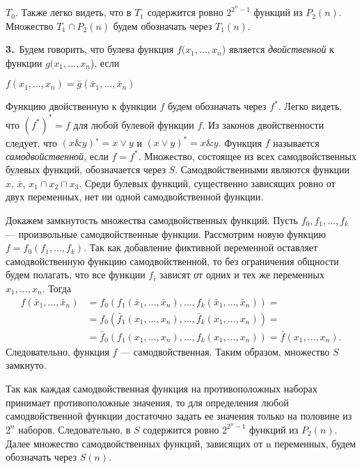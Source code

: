 \documentclass[10pt]{article}
\begin{document}
$T_0$. Также легко видеть, что в $T_1$ содержится ровно $2^{2^n−1}$ функций из
$P_{2}(n)$. Множество $T_1 \cap P_{2}(n)$ будем обозначать через $T_{1}(n)$. \par
{\bf{3.}}\, Будем говорить, что булева функция $f(x_1,\dots,x_n$) является \textit{двойственной} к функции $g(x_1, \dots, x_n$), если
\begin{center} $f(x_1, \dots, x_n) = \bar{g}(\bar{x}_1, \dots, \bar{x}_n)$\end{center}
Функцию двойственную к функции $f$ будем обозначать через $f^{*}$. Легко видеть,
 что $(f^{*})^{*} = f$ для любой булевой функции $f$. Из законов двойственности
 следует, что $(x\&y)^{∗} = x \vee y$ и $(x \vee y)^{*} = x\&y.$ Функция $f$ называется
\textit{самодвойственной}, если $f = f^{*}$. Множество, состоящее из всех самодвойственных
 булевых функций, обозначается через $S$. Самодвойственными являются
 функции $x$, $\bar{x}$, $x_1 \cap x_2 \cap x_3.$ Среди булевых функций, существенно
  зависящих ровно от двух переменных, нет ни одной самодвойственной
функции. \par
Докажем замкнутость множества самодвойственных функций. Пусть
$f_0, f_1, \dots, f_k$ — произвольные самодвойственные функции. Рассмотрим новую
функцию $f = f_0(f_1, \dots, f_k)$. Так как добавление фиктивной переменной
оставляет самодвойственную функцию самодвойственной, то без ограничения
общности будем полагать, что все функции $f_i$ зависят от одних и тех
же переменных $x_1,\dots, x_n$. Тогда\\
\begin{align*}
f(\bar{x}_1, \dots, \bar{x}_n) &= f_0(f_1(\bar{x}_1, \dots, \bar{x}_n), \dots, f_k(\bar{x}_1, \dots, \bar{x}_n))= \\
                               &= f_0(\bar{f}_1(x_1, \dots, x_n), \dots, \bar{f}_k(x_1, \dots, x_n))= \\
                               &= \bar{f}_0(f_1(x_1, \dots, x_n), \dots, f_k(x_1, \dots, x_n)) = \bar{f}(x_1, \dots, x_n).
\end{align*}
Следовательно, функция $f$ — самодвойственная. Таким образом, множество
$S$ замкнуто. \par
Так как каждая самодвойственная функция на противоположных наборах
принимает противоположные значения, то для определения любой
самодвойственной функции достаточно задать ее значения только на половине
из $2^n$ наборов. Следовательно, в $S$ содержится ровно $2^{2^n−1}$ функций
из $P_2(n)$. Далее множество самодвойственных функций, зависящих от n
переменных, будем обозначать через $S(n)$.\par
\end{document}
